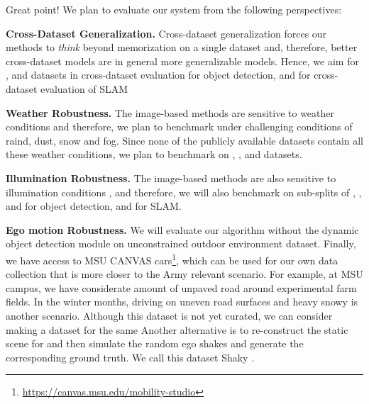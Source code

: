 \documentclass[12pt]{article}
\begin{document}
    Great point! We plan to evaluate our system from the following perspectives:
    \begin{compactitem}
    \item \textbf{Cross-Dataset Generalization.} Cross-dataset generalization forces our methods to \emph{think} beyond memorization on a single dataset and, therefore, better cross-dataset models are in general more generalizable models. Hence, we aim for \nuscenes \cite{caesar2020nuscenes}, \advWeather \cite{bijelic2020seeing} and \ithaca \cite{diaz2022ithaca365} datasets in cross-dataset evaluation for object detection, and \rugd \cite{weigness2019rugd} for cross-dataset evaluation of SLAM
    
    \item \textbf{Weather Robustness.} The image-based methods are sensitive to weather conditions \cite{sun2020scalability} and therefore, we plan to benchmark under challenging conditions of raind, dust, snow and fog. Since none of the publicly available datasets contain all these weather conditions, we plan to benchmark on \waymo \cite{sun2020scalability}, \nuscenes \cite{caesar2020nuscenes}, \advWeather \cite{bijelic2020seeing} and \ithaca \cite{diaz2022ithaca365} datasets.
    
    \item \textbf{Illumination Robustness.} The image-based methods are also sensitive to illumination conditions \cite{kumar2019vpds}, and therefore, we will also benchmark on sub-splits of \waymo \cite{sun2020scalability}, \nuscenes \cite{caesar2020nuscenes}, \advWeather \cite{bijelic2020seeing} and \ithaca \cite{diaz2022ithaca365} for object detection, and \rugd for SLAM.
    
    \item \textbf{Ego motion Robustness.} We will evaluate our algorithm without the dynamic object detection module on unconstrained outdoor environment \rugd \cite{weigness2019rugd} dataset.
    Finally, we have access to MSU CANVAS cars\footnote{\url{https://canvas.msu.edu/mobility-studio}}, which can be used for our own data collection that is more closer to the Army relevant scenario. 
    For example, at MSU campus, we have considerate amount of unpaved road around experimental farm fields. 
    In the winter months, driving on uneven road surfaces and heavy snowy is another scenario. 
    Although this dataset is not yet curated, we can consider making a dataset for the same
    Another alternative is to re-construct the static \threeD scene for \kitti and then simulate the random ego shakes and generate the corresponding ground truth. We call this dataset Shaky \kitti. 
    \end{compactitem}
    
\end{document}
